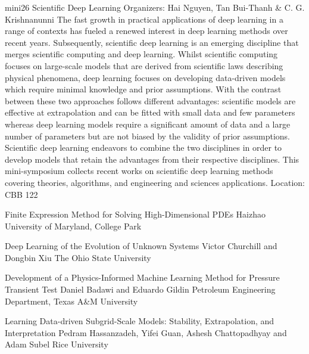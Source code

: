 \mini
{mini26}
{Scientific Deep Learning}
{Organizers: Hai Nguyen, Tan Bui-Thanh \& C. G. Krishnanunni}
{The fast growth in practical applications of deep learning in a range of contexts has fueled a renewed interest in deep learning methods over recent years. Subsequently, scientific deep learning is an emerging discipline that merges scientific computing and deep learning. Whilst scientific computing focuses on large-scale models that are derived from scientific laws describing physical phenomena, deep learning focuses on developing data-driven models which require minimal knowledge and prior assumptions. With the contrast between these two approaches follows different advantages: scientific models are effective at extrapolation and can be fitted with small data and few parameters whereas deep learning models require a significant amount of data and a large number of parameters but are not biased by the validity of prior assumptions. Scientific deep learning endeavors to combine the two disciplines in order to develop models that retain the advantages from their respective disciplines. This mini-symposium collects recent works on scientific deep learning methods covering theories, algorithms, and engineering and sciences applications.}
{Location: CBB 122}

\begin{talks}
\item\talk
{Finite Expression Method for Solving High-Dimensional PDEs}
{Haizhao}
{University of Maryland, College Park}
\item\talk
{Deep Learning of the Evolution of Unknown Systems}
{Victor Churchill and Dongbin Xiu}
{The Ohio State University}
\item\talk
{Development of a Physics-Informed Machine Learning Method for Pressure Transient Test}
{Daniel Badawi and Eduardo Gildin}
{Petroleum Engineering Department, Texas A\&M University}
\item\talk
{Learning Data-driven Subgrid-Scale Models: Stability, Extrapolation, and Interpretation}
{Pedram Hassanzadeh, Yifei Guan, Ashesh Chattopadhyay and Adam Subel}
{Rice University}
\end{talks}
\room
